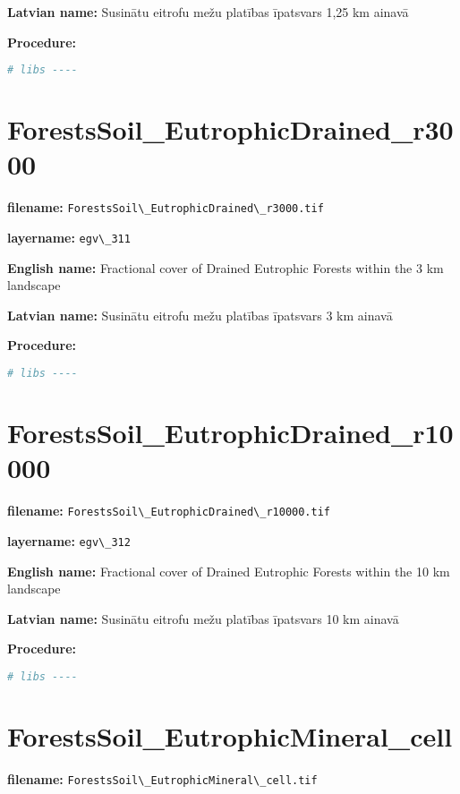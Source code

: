 \documentclass[
]{book}
\newcommand{\passthrough}[1]{#1}
\begin{document}
\textbf{Latvian name:} Susinātu eitrofu mežu platības īpatsvars 1,25 km ainavā

\textbf{Procedure:}

\begin{lstlisting}[language=R]
# libs ----
\end{lstlisting}

\section{ForestsSoil\_EutrophicDrained\_r3000}\label{ch06.311}

\textbf{filename:} \passthrough{\lstinline!ForestsSoil\_EutrophicDrained\_r3000.tif!}

\textbf{layername:} \passthrough{\lstinline!egv\_311!}

\textbf{English name:} Fractional cover of Drained Eutrophic Forests within the 3 km landscape

\textbf{Latvian name:} Susinātu eitrofu mežu platības īpatsvars 3 km ainavā

\textbf{Procedure:}

\begin{lstlisting}[language=R]
# libs ----
\end{lstlisting}

\section{ForestsSoil\_EutrophicDrained\_r10000}\label{ch06.312}

\textbf{filename:} \passthrough{\lstinline!ForestsSoil\_EutrophicDrained\_r10000.tif!}

\textbf{layername:} \passthrough{\lstinline!egv\_312!}

\textbf{English name:} Fractional cover of Drained Eutrophic Forests within the 10 km landscape

\textbf{Latvian name:} Susinātu eitrofu mežu platības īpatsvars 10 km ainavā

\textbf{Procedure:}

\begin{lstlisting}[language=R]
# libs ----
\end{lstlisting}

\section{ForestsSoil\_EutrophicMineral\_cell}\label{ch06.313}

\textbf{filename:} \passthrough{\lstinline!ForestsSoil\_EutrophicMineral\_cell.tif!}
\end{document}
